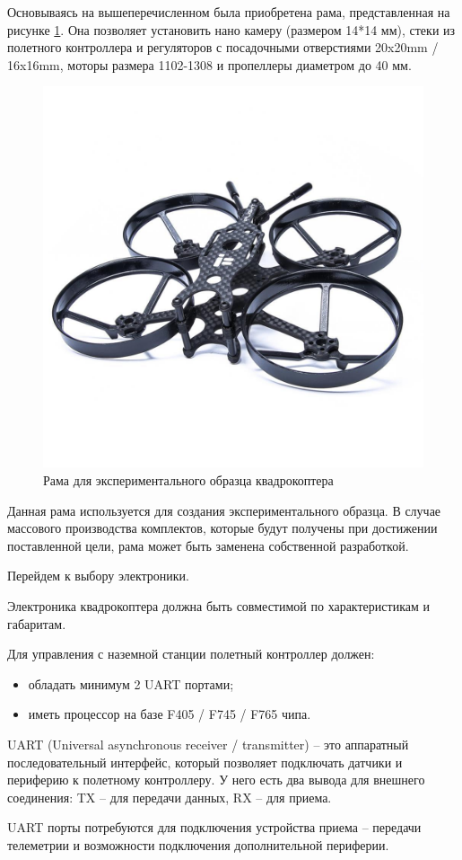 Основываясь на вышеперечисленном была приобретена рама, представленная на рисунке \ref{fig:frame}. Она позволяет установить нано камеру (размером 14*14 мм), стеки из полетного контроллера и регуляторов с посадочными отверстиями 20x20mm / 16x16mm, моторы размера 1102-1308 и пропеллеры диаметром до 40 мм.

\begin{figure}[H]
	\centering
	\includegraphics[width=0.5\linewidth]{../RW/pics/frame}
	\caption{Рама для экспериментального образца квадрокоптера
	}
	\label{fig:frame}
\end{figure}

Данная рама используется для создания экспериментального образца. В случае массового производства комплектов, которые будут получены при достижении поставленной цели, рама может быть заменена собственной разработкой.

Перейдем к выбору электроники.

Электроника квадрокоптера должна быть совместимой по характеристикам и габаритам. 

Для управления с наземной станции полетный контроллер должен:
\begin{itemize}
	\item обладать минимум 2 UART портами;
	\item иметь процессор на базе F405 / F745 / F765 чипа.
\end{itemize}

UART (Universal asynchronous receiver / transmitter) -- это аппаратный последовательный интерфейс, который позволяет подключать датчики и периферию к полетному контроллеру. У него есть два вывода для внешнего соединения: TX -- для передачи данных, RX -- для приема.

UART порты потребуются для подключения устройства приема -- передачи телеметрии и возможности подключения дополнительной периферии.

